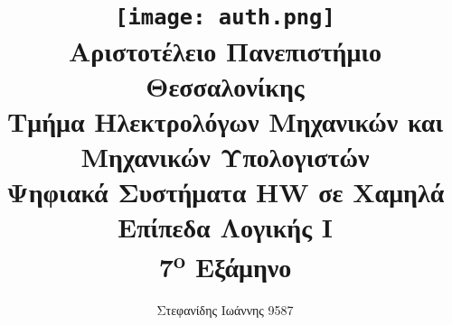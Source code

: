 \title{
	\texttt{[image: auth.png]}\\
	\large{Αριστοτέλειο Πανεπιστήμιο Θεσσαλονίκης}\\
	\large{Τμήμα Ηλεκτρολόγων Μηχανικών και Μηχανικών Υπολογιστών}\\
	\vspace{2cm}
	\LARGE{Ψηφιακά Συστήματα HW σε Χαμηλά Επίπεδα Λογικής Ι}\\
	\vspace{0.5cm}
	\large{7\textsuperscript{o} Εξάμηνο}
	\vspace{3cm}
}

\author{
	Στεφανίδης Ιωάννης 9587
	\vspace{3cm}
}
